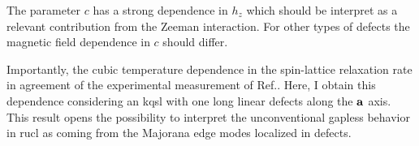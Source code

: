 
The parameter $c$ has a strong dependence in $h_z$ which should be interpret as a relevant contribution from the Zeeman interaction. For other types of defects the magnetic field dependence in $c$ should differ.


Importantly, the cubic temperature dependence in the spin-lattice relaxation rate in agreement of the experimental measurement of Ref.\cite{Zheng-gapless2017}. Here, I obtain this dependence considering an \acrshort{kqsl} with one long linear defects along the $\bf{a}$ axis. This result opens the possibility to interpret the unconventional gapless behavior in \acrshort{rucl} as coming from the Majorana edge modes localized in defects.














